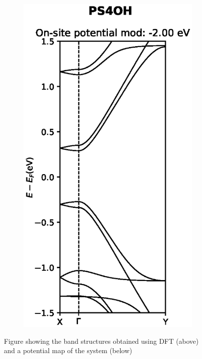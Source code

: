 \begin{figure}[h]
\begin{subfigure}[b]{0.25\textwidth}
    \label{PS4OHmod1}
    \end{subfigure}
    ~
    \begin{subfigure}[b]{0.25\textwidth}
    \centering
    \includegraphics[width=\textwidth]{Figures/PS4OHmod2.eps}
    \label{PS4OHdevmod2}
    \end{subfigure}
    \vspace{-1\baselineskip}
    \caption{Figure showing the band structures obtained using DFT (above) and a potential map of the system (below)}
    \label{PS4OH}
\end{figure}
